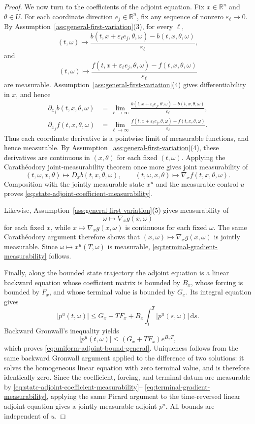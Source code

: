 \documentclass[11pt]{amsart}
\numberwithin{equation}{section} %
\newcommand{\dd}{\mathrm{d}}
\theoremstyle{remark}
\begin{document}
\begin{proof}
We now turn to the coefficients of the adjoint equation. Fix $x \in \mathbb{R}^n$ and $\theta \in U$.  For each coordinate direction $e_j \in \mathbb{R}^n$, fix any sequence of nonzero $\varepsilon_\ell \to 0$.  By Assumption~\ref{ass:general-first-variation}(3), for every $\ell$,
\[
(t,\omega)\longmapsto
\frac{b(t,x+\varepsilon_\ell e_j,\theta,\omega)-b(t,x,\theta,\omega)}{\varepsilon_\ell},
\]
and
\[(t,\omega)\longmapsto
\frac{f(t,x+\varepsilon_\ell e_j,\theta,\omega)-f(t,x,\theta,\omega)}{\varepsilon_\ell}
\]
are measurable. Assumption~\ref{ass:general-first-variation}(4) gives differentiability in $x$, and hence
\[\begin{aligned}
\partial_{x_j}b(t,x,\theta,\omega)
&=\lim_{\ell\to\infty}
\frac{b(t,x+\varepsilon_\ell e_j,\theta,\omega)-b(t,x,\theta,\omega)}{\varepsilon_\ell},\\
\partial_{x_j}f(t,x,\theta,\omega)
&=\lim_{\ell\to\infty}
\frac{f(t,x+\varepsilon_\ell e_j,\theta,\omega)-f(t,x,\theta,\omega)}{\varepsilon_\ell}.
\end{aligned}\]
Thus each coordinate derivative is a pointwise limit of measurable functions, and hence measurable.  By Assumption~\ref{ass:general-first-variation}(4), these derivatives are continuous in $(x,\theta)$ for each fixed $(t,\omega)$. 
Applying the Carath\'eodory joint-measurability theorem once more gives joint measurability of
\[
(t,\omega,x,\theta)
\longmapsto D_x b(t,x,\theta,\omega),
\qquad
(t,\omega,x,\theta)
\longmapsto \nabla_x f(t,x,\theta,\omega).
\]
Composition with the jointly measurable state $x^u$ and the measurable
control $u$ proves \eqref{eq:state-adjoint-coefficient-measurability}.

Likewise, Assumption~\ref{ass:general-first-variation}(5) gives
measurability of
\[
\omega\longmapsto \nabla_x g(x,\omega)
\]
for each fixed $x$, while $x\mapsto\nabla_xg(x,\omega)$ is continuous
for each fixed $\omega$. The same Carath\'eodory argument therefore
shows that $(x,\omega)\mapsto\nabla_xg(x,\omega)$ is jointly
measurable. Since $\omega\mapsto x^u(T,\omega)$ is measurable,
\eqref{eq:terminal-gradient-measurability} follows.

Finally, along the bounded state trajectory the adjoint equation is a
linear backward equation whose coefficient matrix is bounded by
$B_x$, whose forcing is bounded by $F_x$, and whose terminal value is
bounded by $G_x$. Its integral equation gives
\[
|p^u(t,\omega)|
\le
G_x+TF_x
+B_x\int_t^T |p^u(s,\omega)|\,\dd s.
\]
Backward Gronwall's inequality yields
\[
|p^u(t,\omega)|
\le
(G_x+TF_x)e^{B_xT},
\]
which proves \eqref{eq:uniform-adjoint-bound-general}.
Uniqueness follows from the same backward Gronwall argument
applied to the difference of two solutions: it solves the homogeneous
linear equation with zero terminal value, and is therefore identically zero.
Since the coefficient, forcing, and terminal datum are measurable by
\eqref{eq:state-adjoint-coefficient-measurability}--%
\eqref{eq:terminal-gradient-measurability}, applying the same Picard
argument to the time-reversed linear adjoint equation gives a jointly
measurable adjoint $p^u$. All bounds are independent of $u$.
\end{proof}
\end{document}

